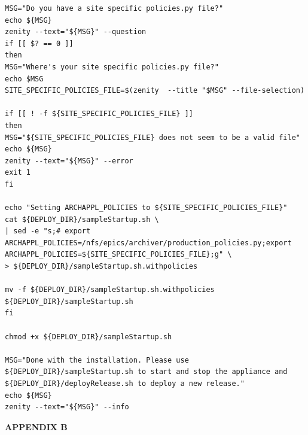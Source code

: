 \documentclass[11pt
  , a4paper
  , article
  , oneside
]{memoir}
\begin{document}
\begin{lstlisting}[style=termstyle]
MSG="Do you have a site specific policies.py file?"
echo ${MSG}
zenity --text="${MSG}" --question
if [[ $? == 0 ]]
then
MSG="Where's your site specific policies.py file?"
echo $MSG
SITE_SPECIFIC_POLICIES_FILE=$(zenity  --title "$MSG" --file-selection)

if [[ ! -f ${SITE_SPECIFIC_POLICIES_FILE} ]]
then
MSG="${SITE_SPECIFIC_POLICIES_FILE} does not seem to be a valid file"
echo ${MSG}
zenity --text="${MSG}" --error
exit 1
fi

echo "Setting ARCHAPPL_POLICIES to ${SITE_SPECIFIC_POLICIES_FILE}"
cat ${DEPLOY_DIR}/sampleStartup.sh \
| sed -e "s;# export ARCHAPPL_POLICIES=/nfs/epics/archiver/production_policies.py;export ARCHAPPL_POLICIES=${SITE_SPECIFIC_POLICIES_FILE};g" \
> ${DEPLOY_DIR}/sampleStartup.sh.withpolicies

mv -f ${DEPLOY_DIR}/sampleStartup.sh.withpolicies ${DEPLOY_DIR}/sampleStartup.sh
fi

chmod +x ${DEPLOY_DIR}/sampleStartup.sh

MSG="Done with the installation. Please use ${DEPLOY_DIR}/sampleStartup.sh to start and stop the appliance and ${DEPLOY_DIR}/deployRelease.sh to deploy a new release." 
echo ${MSG}
zenity --text="${MSG}" --info	
\end{lstlisting}
\begin{center}
\label{appx:b}\LARGE\textbf{APPENDIX B}
\end{center}
\end{document}
